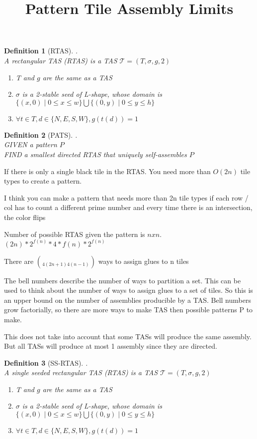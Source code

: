 \documentclass[12pt]{article}
\title{Pattern Tile Assembly Limits}
\newtheorem{definition}{Definition}
\begin{document}
\begin{definition}[RTAS].\\
    A rectangular TAS (RTAS) is a TAS $\mathcal{T} = (T, \sigma, g, 2)$
    \begin{enumerate}
        \item T and $g$ are the same as a TAS
        \item $\sigma$ is a 2-stable seed of L-shape, whose domain is $\{ (x, 0) \mid 0 \le x \le w \} \bigcup \{ (0, y) \mid 0 \le y \le h    \}$
        \item $\forall t \in T, d \in \{N,E,S,W\}, g(t(d)) = 1$
    \end{enumerate}
\end{definition}


\begin{definition}[PATS]. \\
    GIVEN a pattern $P$ \\
    FIND a smallest directed RTAS that uniquely self-assembles $P$
\end{definition}

If there is only a single black tile in the RTAS. You need more than $O(2n)$ tile types to create a pattern. 

I think you can make a pattern that needs more than 2n tile types if each row / col has to count a different prime number and every time there is an intersection, the color flips

Number of possible RTAS given the pattern is $nxn$. $(2n) * 2^{f(n)} * 4 * f(n) * 2^{f(n)}$

There are $\choose{4(2n+1)}{4(n-1)}$ ways to assign glues to n tiles

The bell numbers describe the number of ways to partition a set. This can be used to think about the number of ways to assign glues to a set of tiles. So this is an upper bound on the number of assemblies producible by a TAS. Bell numbers grow factorially, so there are more ways to make TAS then possible patterns P to make.

This does not take into account that some TASs will produce the same assembly. But all TASs will produce at most 1 assembly since they are directed. 




\begin{definition}[SS-RTAS].\\
    A single seeded rectangular TAS (RTAS) is a TAS $\mathcal{T} = (T, \sigma, g, 2)$
    \begin{enumerate}
        \item T and $g$ are the same as a TAS
        \item $\sigma$ is a 2-stable seed of L-shape, whose domain is $\{ (x, 0) \mid 0 \le x \le w \} \bigcup \{ (0, y) \mid 0 \le y \le h    \}$
        \item $\forall t \in T, d \in \{N,E,S,W\}, g(t(d)) = 1$
    \end{enumerate}
\end{definition}
\end{document}
